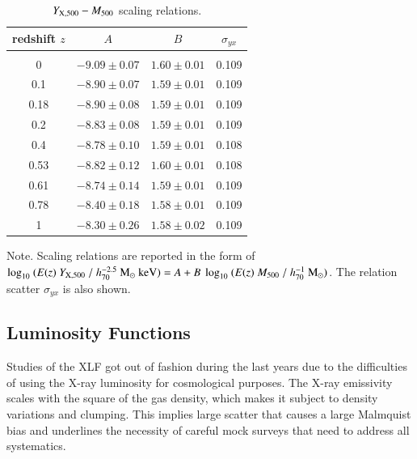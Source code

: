 \documentclass[useAMS,usenatbib]{mn2e}
\begin{document}
\begin{table} 
\begin{center}
\caption{$Y_{{\mathrm{X}}, 500}-M_{500}$ scaling relations.}
\medskip
\begin{tabular}{cccc}
\hline
\phantom{\Big|}
redshift $z$ & $A$ & $B$ & $\sigma_{yx}$ \\
\hline\\[-0.5em]
 0      & $-9.09\pm0.07$ & $1.60\pm0.01$ & 0.109\\
 0.1   & $-8.90\pm0.07$ & $1.59\pm0.01$ & 0.109\\
 0.18   & $-8.90\pm0.08$ & $1.59\pm0.01$ & 0.109\\
 0.2   & $-8.83\pm0.08$ & $1.59\pm0.01$ & 0.109\\ 
 0.4   & $-8.78\pm0.10$ & $1.59\pm0.01$ & 0.108\\ 
 0.53   & $-8.82\pm0.12$ & $1.60\pm0.01$ & 0.108\\ 
 0.61 & $-8.74\pm0.14$ & $1.59\pm0.01$ & 0.109\\ 
 0.78 & $-8.40\pm0.18$ & $1.58\pm0.01$ & 0.109\\ 
 1      & $-8.30\pm0.26$ & $1.58\pm0.02$ & 0.109\\[0.5em]  
\hline
\end{tabular}
\label{tab:YXfits}
\end{center}
\footnotesize{Note. Scaling relations are reported in the form of $\log_{10}~(E(z)~Y_{{\mathrm{X}},500}~/~h_{70}^{-2.5}~{\mathrm{M_{\odot}}}~{\mathrm{keV}})=A+B~\log_{10}~(E(z)~M_{500}~/~h_{70}^{-1}~{\mathrm{M_{\odot}}})$. The relation scatter $\sigma_{yx}$ is also shown.}
\end{table}


\subsection{Luminosity Functions}
Studies of the XLF got out of fashion during the last years due to the
difficulties of using the X-ray luminosity for cosmological purposes. The X-ray
emissivity scales with the square of the gas density, which makes it subject to
density variations and clumping. This implies large scatter that causes a
large Malmquist bias and underlines the necessity of careful mock surveys that
need to address all systematics.
\end{document}
